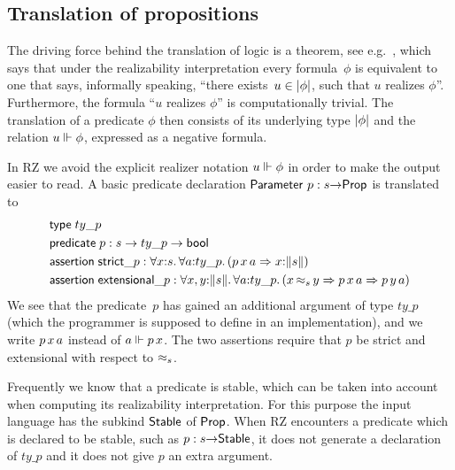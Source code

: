 \subsection{Translation of propositions}
\label{sec:transl-prop}

The driving force behind the translation of logic is a theorem, see
e.g.\ \cite[Thm.~4.4.10]{Troelstra:van-Dalen:88:1}, which says that
under the realizability interpretation every formula~$\phi$ is
equivalent to one that says, informally speaking, ``there exists~$u
\in |\phi|$, such that $u$ realizes $\phi$''. Furthermore, the
formula ``$u$ realizes $\phi$'' is computationally trivial. The
translation of a predicate $\phi$ then consists of its underlying type
$|\phi|$ and the relation $u \Vdash \phi$, expressed as a negative
formula.

In RZ we avoid the explicit realizer notation $u \Vdash \phi$ in order to
make the output easier to read. A basic predicate declaration
$\mathsf{Parameter}\ p : s{\to}\mathsf{Prop}$ is translated to
%
\begin{align*}
  & \otyspec{ty\_p} \\
  & \opropspec{p}{s \to ty\_p \to \oProp} \\
  & \oassertion{\mathsf{strict}\_p}{
    \oforall{x}{s}{
      \oforall{a}{ty\_p}{
        (\oimply
        {\oapp{\oapp{p}{x}}{a}}
        {\ototal{x}{s}
        })
      }
    }
  } \\
  & \oassertion{\mathsf{extensional}\_p}{
    \oforallt{x,y}{s}{
      \oforall{a}{ty\_p}{
          (\oimply{\oper{s}{x}{y}}
          {\oimply{\oapp{\oapp{p}{x}}{a}}{\oapp{\oapp{p}{y}}{a}}})
          }}}
\end{align*}
%
We see that the predicate~$p$ has gained an additional argument of
type $ty\_p$ (which the programmer is supposed to define in an
implementation), and we write $p\,x\,a$ instead of $a
\Vdash p\,x$. The two assertions require that $p$ be strict and
extensional with respect to $\approx_s$.


Frequently we know that a predicate is stable, which can be taken into
account when computing its realizability interpretation. For this
purpose the input language has the subkind $\mathsf{Stable}$ of $\mathsf{Prop}$.
When RZ encounters a predicate which is declared to be stable, such as
$p : s{\to}\mathsf{Stable}$, it does not generate a declaration of
$ty\_p$ and it does not give $p$ an extra argument.

